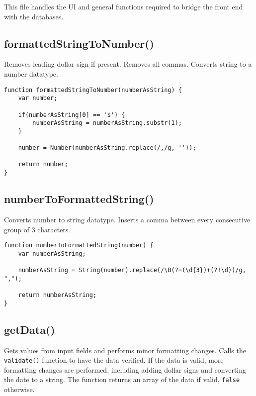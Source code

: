 \documentclass[letterpaper]{article}
\begin{document}
This file handles the UI and general functions required to bridge the front end with the databases.

\subsection{formattedStringToNumber()}

Removes leading dollar sign if present.
Removes all commas.
Converts string to a number datatype.

\begin{lstlisting}[firstnumber=1]
function formattedStringToNumber(numberAsString) {
    var number;

    if(numberAsString[0] == '$') {
        numberAsString = numberAsString.substr(1);
    }

    number = Number(numberAsString.replace(/,/g, ''));

    return number;
}
\end{lstlisting}

\subsection{numberToFormattedString()}

Converts number to string datatype.
Inserts a comma between every consecutive group of 3 characters.

\begin{lstlisting}[firstnumber=13]
function numberToFormattedString(number) {
    var numberAsString;

    numberAsString = String(number).replace(/\B(?=(\d{3})+(?!\d))/g, ",");

    return numberAsString;
}
\end{lstlisting}

\subsection{getData()}

Gets values from input fields and performs minor formatting changes.
Calls the \lstinline{validate()} function to have the data verified.
If the data is valid, more formatting changes are performed, including adding dollar signs and converting the date to a string.
The function returns an array of the data if valid, \lstinline{false} otherwise.
\end{document}

